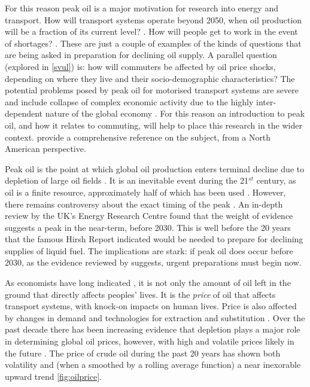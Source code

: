 For this reason peak oil is a major motivation for research into energy and
transport. How will transport systems operate beyond 2050,
when oil production will be a fraction of its current level? 
\citep{Aftabuzzaman2011}.
How will people get to work in the event of shortages?
\citep{Noland2006}. These are just a couple of examples of
the kinds of questions that are being asked in preparation for
declining oil supply. A parallel question
(explored in \cref{svul}) is: how will commuters be affected by
oil price shocks, depending on where they live and their socio-demographic
characteristics? The potential problems posed
by peak oil for motorised transport systems are severe and include
collapse of complex economic activity due to the
highly inter-dependent nature of the global economy \citep{Friedrichs2010,
Korowicz2011}.
For this reason an introduction to peak oil, and how it relates
to commuting, will help to place this research in the wider
context. \citet{Gilbert2008} provide a comprehensive reference
on the subject, from a North American perspective.

Peak oil is the point at which global oil production
enters terminal decline due to depletion of large oil fields
\citep{Greer2008}. It is an inevitable event during the 21$^{st}$
century, as oil is a finite resource, approximately half of which
has been used \citep{Aleklett2010}. However, there remains controversy
about the exact timing of the peak \citep{Smil2008}.
An in-depth review by the UK's Energy Research Centre \citep{UKERC2009}
found that the weight of evidence suggests a peak in the near-term,
before 2030. This is
well before the 20 years that the famous Hirsh Report \citep{Hirsch2005}
indicated would be needed to prepare for declining supplies of liquid fuel.
The implications are stark: if peak oil does occur before 2030, as
the evidence reviewed by \citet{UKERC2009} suggests, urgent preparations
must begin now.

As economists have long indicated \citep{Solow1974},
it is not only the amount of oil left in the ground
that directly affects peoples' lives. It is the \emph{price} of oil that
affects transport systems, with knock-on impacts on human lives.
Price is also affected by changes in demand and technologies for
extraction and substitution \citep{Perman2003}.
Over the past decade there has been increasing evidence that depletion
plays a major role in determining global oil prices, however,
with high and volatile prices likely in the future \citep{Aleklett2012-peeking}.
The price of crude oil during the past 20 years has shown both volatility
and (when a smoothed by a rolling average function) a near inexorable
upward trend \cref{fig:oilprice}. 


